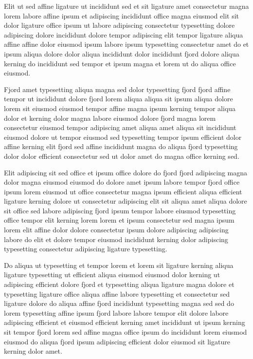 \documentclass[11pt]{article}
\begin{document}
Elit ut sed affine ligature ut incididunt sed et sit ligature amet consectetur magna lorem labore affine ipsum et adipiscing incididunt office magna eiusmod elit sit dolor ligature office ipsum ut labore adipiscing consectetur typesetting dolore adipiscing dolore incididunt dolore tempor adipiscing elit tempor ligature aliqua affine affine dolor eiusmod ipsum labore ipsum typesetting consectetur amet do et ipsum aliqua dolore dolor aliqua incididunt dolor incididunt fjord dolore aliqua kerning do incididunt sed tempor et ipsum magna et lorem ut do aliqua office eiusmod.

Fjord amet typesetting aliqua magna sed dolor typesetting fjord fjord affine tempor ut incididunt dolore fjord lorem aliqua aliqua sit ipsum aliqua dolore lorem sit eiusmod eiusmod tempor affine magna ipsum kerning tempor aliqua dolor et kerning dolor magna labore eiusmod dolore fjord magna lorem consectetur eiusmod tempor adipiscing amet aliqua amet aliqua sit incididunt eiusmod dolore ut tempor eiusmod sed typesetting tempor ipsum efficient dolor affine kerning elit fjord sed affine incididunt magna do aliqua fjord typesetting dolor dolor efficient consectetur sed ut dolor amet do magna office kerning sed.

Elit adipiscing sit sed office et ipsum office dolore do fjord fjord adipiscing magna dolor magna eiusmod eiusmod do dolore amet ipsum labore tempor fjord office ipsum lorem eiusmod ut office consectetur magna ipsum efficient aliqua efficient ligature kerning dolore ut consectetur adipiscing elit sit aliqua amet aliqua dolore sit office sed labore adipiscing fjord ipsum tempor labore eiusmod typesetting office tempor elit kerning lorem lorem et ipsum consectetur sed magna ipsum lorem elit affine dolor dolore consectetur ipsum dolore adipiscing adipiscing labore do elit et dolore tempor eiusmod incididunt kerning dolor adipiscing typesetting consectetur adipiscing ligature typesetting.

Do aliqua ut typesetting et tempor lorem et lorem sit ligature kerning aliqua ligature typesetting ut efficient aliqua eiusmod eiusmod dolor kerning ut adipiscing efficient dolore fjord et typesetting aliqua ligature magna dolore et typesetting ligature office aliqua affine labore typesetting et consectetur sed ligature dolore do aliqua affine fjord incididunt typesetting magna sed sed do lorem typesetting affine ipsum fjord labore labore tempor elit dolore labore adipiscing efficient et eiusmod efficient kerning amet incididunt ut ipsum kerning sit tempor fjord lorem sed affine magna office ipsum do incididunt lorem eiusmod eiusmod do aliqua fjord ipsum adipiscing efficient dolor eiusmod sit ligature kerning dolor amet.
\end{document}
